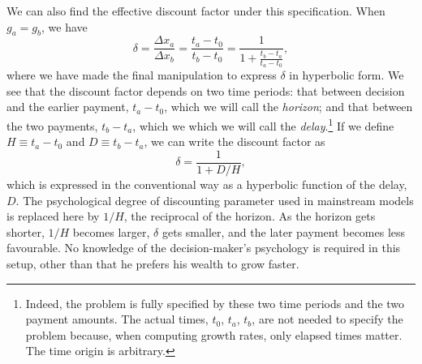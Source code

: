 \documentclass[11pt]{article}
\newcommand{\be}{\begin{equation}}
\newcommand{\ee}{\end{equation}}
\newcommand{\Dt}{\Delta t}
\newcommand{\Dx}{\Delta x}
\newcommand{\Epsilon}{\mathcal{E}}
\newcommand{\del}{D}
\newcommand{\hor}{H}
\numberwithin{equation}{section}
\begin{document}
We can also find the effective discount factor under this specification. When $g_a=g_b$, we have
\be
\delta = \frac{\Dx_a}{\Dx_b} = \frac{t_a-t_0}{t_b-t_0} = \frac{1}{1+\frac{t_b-t_a}{t_a-t_0}},
\ee
where we have made the final manipulation to express $\delta$ in hyperbolic form. We see that the discount factor depends on two time periods: that between decision and the earlier payment, $t_a-t_0$, which we will call the \textit{horizon}; and that between the two payments, $t_b-t_a$, which we which we will call the \textit{delay}.\footnote{Indeed, the problem is fully specified by these two time periods and the two payment amounts. The actual times, $t_0$, $t_a$, $t_b$, are not needed to specify the problem because, when computing growth rates, only elapsed times matter. The time origin is arbitrary.} If we define $\hor\equiv t_a-t_0$ and $\del\equiv t_b-t_a$, we can write the discount factor as
\be
\delta = \frac{1}{1+\del/\hor},
\ee
which is expressed in the conventional way as a hyperbolic function of the delay, $\del$. The psychological degree of discounting parameter used in mainstream models is replaced here by $1/\hor$, the reciprocal of the horizon. As the horizon gets shorter, $1/\hor$ becomes larger, $\delta$ gets smaller, and the later payment becomes less favourable. No knowledge of the decision-maker's psychology is required in this setup, other than that he prefers his wealth to grow faster.

%
%
%
%
\end{document}
